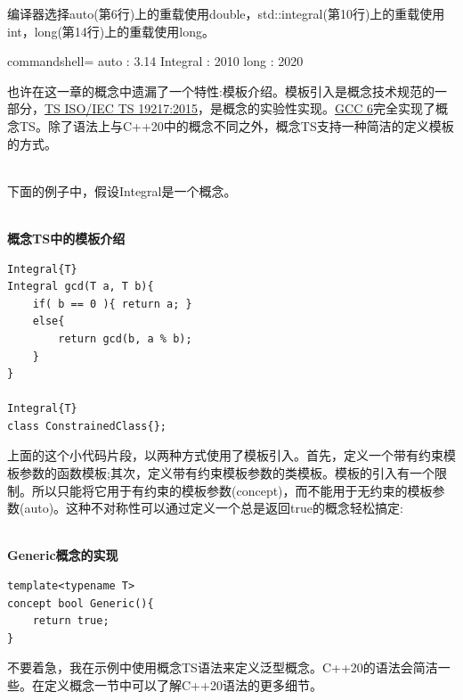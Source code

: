编译器选择auto(第6行)上的重载使用double，std::integral(第10行)上的重载使用int，long(第14行)上的重载使用long。

\begin{tcblisting}{commandshell={}}
auto : 3.14
Integral : 2010
long : 2020
\end{tcblisting}

\begin{tcolorbox}[breakable,enhanced jigsaw,colback=blue!5!white,colframe=blue!75!black,title={遗漏的特性:模板介绍}]
也许在这一章的概念中遗漏了一个特性:模板介绍。模板引入是概念技术规范的一部分，\href{https://www.iso.org/standard/64031.html}{TS ISO/IEC TS 19217:2015}，是概念的实验性实现。\href{https://en.wikipedia.org/wiki/GNU_Compiler_Collection}{GCC 6}完全实现了概念TS。除了语法上与C++20中的概念不同之外，概念TS支持一种简洁的定义模板的方式。

\hspace*{\fill} \\ %
下面的例子中，假设Integral是一个概念。

\hspace*{\fill} \\ %
\noindent
\textbf{概念TS中的模板介绍}
\begin{lstlisting}[style=styleCXX]
Integral{T}
Integral gcd(T a, T b){
	if( b == 0 ){ return a; }
	else{
		return gcd(b, a % b);
	}
}

Integral{T}
class ConstrainedClass{};
\end{lstlisting}

上面的这个小代码片段，以两种方式使用了模板引入。首先，定义一个带有约束模板参数的函数模板;其次，定义带有约束模板参数的类模板。模板的引入有一个限制。所以只能将它用于有约束的模板参数(concept)，而不能用于无约束的模板参数(auto)。这种不对称性可以通过定义一个总是返回true的概念轻松搞定: 

\hspace*{\fill} \\ %
\noindent
\textbf{Generic概念的实现}
\begin{lstlisting}[style=styleCXX]
template<typename T>
concept bool Generic(){
	return true;
}
\end{lstlisting}

不要着急，我在示例中使用概念TS语法来定义泛型概念。C++20的语法会简洁一些。在定义概念一节中可以了解C++20语法的更多细节。
\end{tcolorbox}


